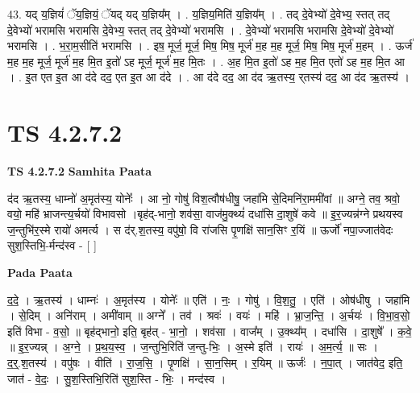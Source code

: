 \documentclass[17pt]{extarticle}
\begin{document}
43. यद् य॒ज्ञियं॑ ॅय॒ज्ञियं॒ ॅयद् यद् य॒ज्ञिय᳚म् । . य॒ज्ञिय॒मिति॑ य॒ज्ञिय᳚म् । . तद् दे॒वेभ्यो॑ दे॒वेभ्य॒ स्तत् तद् दे॒वेभ्यो॑ भरामसि भरामसि दे॒वेभ्य॒ स्तत् तद् दे॒वेभ्यो॑ भरामसि । . दे॒वेभ्यो॑ भरामसि भरामसि दे॒वेभ्यो॑ दे॒वेभ्यो॑ भरामसि । . भ॒रा॒म॒सीति॑ भरामसि । . इष॒ मूर्ज॒ मूर्ज॒ मिष॒ मिष॒ मूर्ज॑ म॒ह म॒ह मूर्ज॒ मिष॒ मिष॒ मूर्ज॑ म॒हम् । . ऊर्ज॑ म॒ह म॒ह मूर्ज॒ मूर्ज॑ म॒ह मि॒त इ॒तो॑ ऽह मूर्ज॒ मूर्ज॑ म॒ह मि॒तः । . अ॒ह मि॒त इ॒तो॑ ऽह म॒ह मि॒त एतो॑ ऽह म॒ह मि॒त आ । . इ॒त एत इ॒त आ द॑दे दद॒ एत इ॒त आ द॑दे । . आ द॑दे दद॒ आ द॑द ऋ॒तस्य॒ र्‌तस्य॑ दद॒ आ द॑द ऋ॒तस्य॑ । \newline
\pagebreak
{}

\section{ TS 4.2.7.2 }

\textbf{TS 4.2.7.2 } \newline
\textbf{Samhita Paata} \newline

द॑द ऋ॒तस्य॒ धाम्नो॑ अ॒मृत॑स्य॒ योनेः᳚ । आ नो॒ गोषु॑ विश॒त्वौष॑धीषु॒ जहा॑मि से॒दिमनि॑रा॒ममी॑वां ॥ अग्ने॒ तव॒ श्रवो॒ वयो॒ महि॑ भ्राजन्त्य॒र्चयो॑ विभावसो ।बृह॑द्-भानो॒ शव॑सा॒ वाज॑मु॒क्थ्यं॑ दधा॑सि दा॒शुषे॑ कवे ॥ इ॒र॒ज्यन्न॑ग्ने प्रथयस्व ज॒न्तुभि॑र॒स्मे रायो॑ अमर्त्य । स द॑र्.श॒तस्य॒ वपु॑षो॒ वि रा॑जसि पृ॒णक्षि॑ सान॒सिꣳ र॒यिं ॥ ऊर्जो॑ नपा॒ज्जात॑वेदः सुश॒स्तिभि॒-र्मन्द॑स्व - [  ] \newline

\textbf{Pada Paata} \newline

द॒दे॒ । ऋ॒तस्य॑ । धाम्नः॑ । अ॒मृत॑स्य । योनेः᳚ ॥ एति॑ । नः॒ । गोषु॑ । वि॒श॒तु॒ । एति॑ । ओष॑धीषु । जहा॑मि । से॒दिम् । अनि॑राम् । अमी॑वाम् ॥ अग्ने᳚ । तव॑ । श्रवः॑ । वयः॑ । महि॑ । भ्रा॒ज॒न्ति॒ । अ॒र्चयः॑ । वि॒भा॒व॒सो॒ इति॑ विभा - व॒सो॒ ॥ बृह॑द्भानो॒ इति॒ बृह॑त् - भा॒नो॒ । शव॑सा । वाज᳚म् । उ॒क्थ्य᳚म् । दधा॑सि । दा॒शुषे᳚ । क॒वे॒ ॥ इ॒र॒ज्यन्न् । अ॒ग्ने॒ । प्र॒थ॒य॒स्व॒ । ज॒न्तुभि॒रिति॑ ज॒न्तु-भिः॒ । अ॒स्मे इति॑ । रायः॑ । अ॒म॒र्त्य॒ ॥ सः । द॒र्॒.श॒तस्य॑ । वपु॑षः । वीति॑ । रा॒ज॒सि॒ । पृ॒णक्षि॑ । सा॒न॒सिम् । र॒यिम् ॥ ऊर्जः॑ । न॒पा॒त् । जात॑वेद॒ इति॒ जात॑ - वे॒दः॒ । सु॒श॒स्तिभि॒रिति॑ सुश॒स्ति - भिः॒ । मन्द॑स्व ।  \newline
\end{document}

